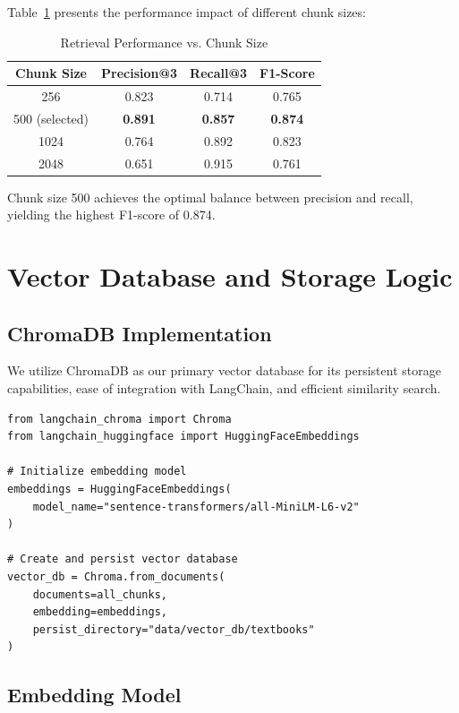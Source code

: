 \documentclass[11pt,a4paper]{article}
\begin{document}
Table~\ref{tab:chunk_comparison} presents the performance impact of different chunk sizes:

\begin{table}[H]
\centering
\begin{tabular}{cccc}
\toprule
\textbf{Chunk Size} & \textbf{Precision@3} & \textbf{Recall@3} & \textbf{F1-Score} \\
\midrule
256 & 0.823 & 0.714 & 0.765 \\
500 (selected) & \textbf{0.891} & \textbf{0.857} & \textbf{0.874} \\
1024 & 0.764 & 0.892 & 0.823 \\
2048 & 0.651 & 0.915 & 0.761 \\
\bottomrule
\end{tabular}
\caption{Retrieval Performance vs. Chunk Size}
\label{tab:chunk_comparison}
\end{table}

Chunk size 500 achieves the optimal balance between precision and recall, yielding the highest F1-score of 0.874.

\section{Vector Database and Storage Logic}

\subsection{ChromaDB Implementation}

We utilize ChromaDB as our primary vector database for its persistent storage capabilities, ease of integration with LangChain, and efficient similarity search.

\begin{lstlisting}[caption=ChromaDB Storage Implementation]
from langchain_chroma import Chroma
from langchain_huggingface import HuggingFaceEmbeddings

# Initialize embedding model
embeddings = HuggingFaceEmbeddings(
    model_name="sentence-transformers/all-MiniLM-L6-v2"
)

# Create and persist vector database
vector_db = Chroma.from_documents(
    documents=all_chunks,
    embedding=embeddings,
    persist_directory="data/vector_db/textbooks"
)
\end{lstlisting}

\subsection{Embedding Model}
\end{document}
